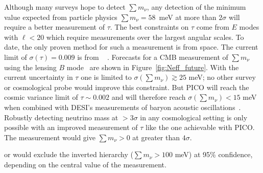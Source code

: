 \documentclass[PICOReport.tex]{subfiles}
\begin{document}

Although many surveys hope to detect $\sum m_\nu$, any detection 
of the minimum value expected from particle physics $\sum m_\nu = 58$~meV at more than $2 \sigma$ will 
require a better measurement of $\tau$.  The best constraints on $\tau$ come from $E$ modes with $\ell < 20$ which require 
measurements over the largest angular scales. To date, the only proven method for such a measurement is from space. 
The current limit of $\sigma({\tau}) = 0.009$ is from \planck~\cite{planck2016_xlvi} .  Forecasts for a
CMB measurement of $\sum m_\nu$ using the lensing $B$ mode~\cite{Kaplinghat:2003bh} are shown in 
Figure~\ref{fig:Neff_future}.  With the current uncertainty in $\tau$ one is limited to  
$\sigma(\sum m_\nu) \gtrsim 25$ meV; no other survey or cosmological probe would improve this constraint.  
But PICO will reach the cosmic variance limit of $\tau \sim 0.002$ and will therefore 
reach $\sigma(\sum m_\nu) < 15$ meV when combined with DESI's measurements of 
baryon acoustic oscillations~\cite{Levi:2013gra}.  Robustly detecting neutrino mass at  $> 3\sigma$ in any cosmological setting is 
only possible with an improved measurement of $\tau$ like the one achievable with PICO. The measurement
would give  $\sum m_\nu>0$ at greater than $4\sigma$. 

or would exclude the inverted hierarchy ($\sum m_\nu > 100$ meV) at 95\% confidence, depending on the central value of the measurement.

\end{document}
